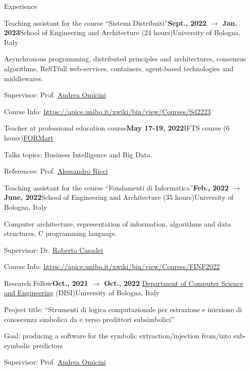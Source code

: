 \documentclass{resume} %
\begin{document}
\begin{rSection}{Experience}
        \begin{rSubsection}{Teaching assistant for the course ``Sistemi Distribuiti''}{\textbf{Sept., 2022 $\rightarrow$ Jan. 2023}}{School of Engineering and Architecture (24 hours)}{University of Bologna, Italy}
            \item Asynchronous programming, distributed principles and architectures, consensus algorithms, ReSTfull web-services, containers, agent-based technologies and middlewares.
            \item Supervisor: Prof. \href{mailto:andrea.omicini@unibo.it}{Andrea Omicini}
            \item Course Info: \url{https://apice.unibo.it/xwiki/bin/view/Courses/Sd2223}
        \end{rSubsection}
        
        \begin{rSubsection}{Teacher at professional education course}{\textbf{May 17-19, 2022}}{IFTS course (6 hours)}{\href{http://www.formart.it/home}{FORMart}}
            \item Talks topics: Business Intelligence and Big Data.
            \item References:  Prof. \href{mailto:a.ricci@unibo.it}{Alessandro Ricci}
        \end{rSubsection}
        
        \begin{rSubsection}{Teaching assistant for the course ``Fondamenti di Informatica''}{\textbf{Feb., 2022 $\rightarrow$ June, 2022}}{School of Engineering and Architecture (35 hours)}{University of Bologna, Italy}
            \item Computer architecture, representation of information, algorithms and data structures, C programming language.
            \item Supervisor: Dr. \href{mailto:roberto.casadei@unibo.it}{Roberto Casadei}
            \item Course Info: \url{https://apice.unibo.it/xwiki/bin/view/Courses/FINF2022}
        \end{rSubsection}
        
        \begin{rSubsection}{Research Fellow}{\textbf{Oct., 2021 $\rightarrow$ Oct., 2022}}{ \href{https://disi.unibo.it/it}{Department of Computer Science and Engineering} (DISI)}{University of Bologna, Italy}
            \item Project title: ``Strumenti di logica computazionale per estrazione e iniezione di conoscenza simbolica da e verso predittori subsimbolici''
            \item Goal: producing a software for the symbolic extraction/injection from/into sub-symbolic predictors
            \item Supervisor: Prof. \href{mailto:andrea.omicini@unibo.it}{Andrea Omicini}
        \end{rSubsection}
        

\end{rSection}
\end{document}
